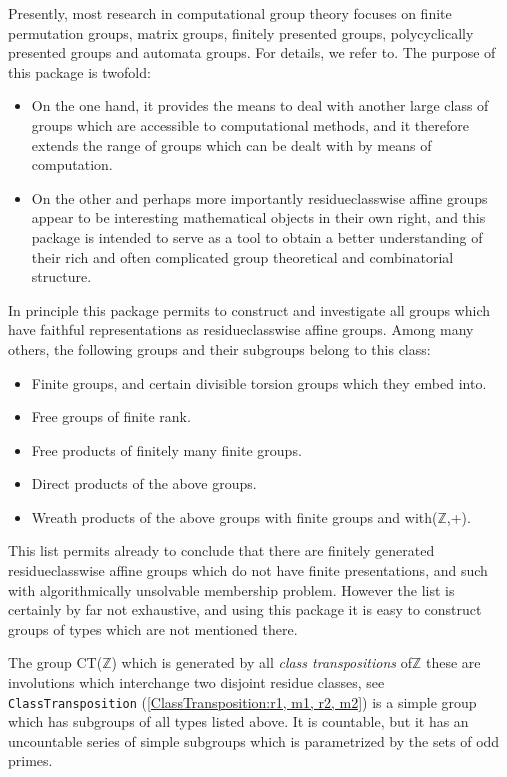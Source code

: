 \documentclass[a4paper,11pt]{report}
\begin{document}
{ Presently, most research in computational group theory focuses on finite
permutation groups, matrix groups, finitely presented groups, polycyclically
presented groups and automata groups. For details, we refer to{\nobreakspace}\cite{HoltEickOBrien05}. The purpose of this package is twofold: 
\begin{itemize}
\item  On the one hand, it provides the means to deal with another large class of
groups which are accessible to computational methods, and it therefore extends
the range of groups which can be dealt with by means of computation. 
\item  On the other \texttt{}\texttt{} and perhaps more
importantly \texttt{}\texttt{}
residue\texttt{}class\texttt{}wise affine groups appear
to be interesting mathematical objects in their own right, and this package is
intended to serve as a tool to obtain a better understanding of their rich and
often complicated group theoretical and combinatorial structure. 
\end{itemize}
 In principle this package permits to construct and investigate all groups
which have faithful representations as
residue\texttt{}class\texttt{}wise affine groups. Among
many others, the following groups and their subgroups belong to this class: 
\begin{itemize}
\item  Finite groups, and certain divisible torsion groups which they embed into. 
\item  Free groups of finite rank. 
\item  Free products of finitely many finite groups. 
\item  Direct products of the above groups. 
\item  Wreath products of the above groups with finite groups and
with{\nobreakspace}({\ensuremath{\mathbb Z}},+). 
\end{itemize}
 This list permits already to conclude that there are finitely generated
residue\texttt{}class\texttt{}wise affine groups which
do not have finite presentations, and such with algorithmically unsolvable
membership problem. However the list is certainly by far not exhaustive, and
using this package it is easy to construct groups of types which are not
mentioned there. 

 The group CT({\ensuremath{\mathbb Z}}) which is generated by all \emph{class transpositions} of{\nobreakspace}{\ensuremath{\mathbb Z}}
\texttt{}\texttt{} these are involutions which
interchange two disjoint residue classes, see \texttt{ClassTransposition} (\ref{ClassTransposition:r1, m1, r2, m2}) \texttt{}\texttt{} is a simple group which has subgroups
of all types listed above. It is countable, but it has an uncountable series
of simple subgroups which is parametrized by the sets of odd primes. 

}
\end{document}
